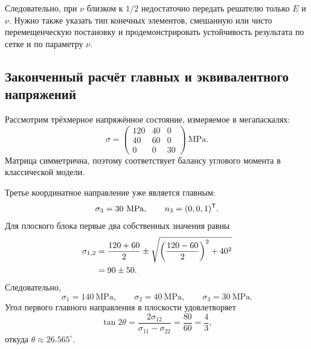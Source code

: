 Следовательно, при $\nu$ близком к $1/2$ недостаточно передать решателю только $E$ и $\nu$. Нужно также указать тип конечных элементов, смешанную или чисто перемещенческую постановку и продемонстрировать устойчивость результата по сетке и по параметру $\nu$.

\subsection{Законченный расчёт главных и эквивалентного напряжений}
\label{subsec:worked-von-mises-v05}

Рассмотрим трёхмерное напряжённое состояние, измеряемое в мегапаскалях:
\begin{equation}
\label{eq:worked-stress-tensor-v05}
 \sigma
 =
 \begin{pmatrix}
 120&40&0\\
 40&60&0\\
 0&0&30
 \end{pmatrix}
 \ \mathrm{MPa}.
\end{equation}
Матрица симметрична, поэтому соответствует балансу углового момента в классической модели.

Третье координатное направление уже является главным:
\[
 \sigma_3=30\ \mathrm{MPa},
 \qquad
 n_3=(0,0,1)^{\mathsf{T}}.
\]
Для плоского блока первые два собственных значения равны
\begin{align}
 \sigma_{1,2}
 &=\frac{120+60}{2}
 \pm
 \sqrt{
 \left(\frac{120-60}{2}\right)^2+40^2
 }
 \notag\\
 &=90\pm 50.
 \label{eq:worked-principal-stresses-v05}
\end{align}
Следовательно,
\begin{equation}
\label{eq:worked-principal-values-v05}
 \sigma_1=140\ \mathrm{MPa},
 \qquad
 \sigma_2=40\ \mathrm{MPa},
 \qquad
 \sigma_3=30\ \mathrm{MPa}.
\end{equation}
Угол первого главного направления в плоскости удовлетворяет
\begin{equation}
\label{eq:worked-principal-angle-v05}
 \tan 2\theta
 =\frac{2\sigma_{12}}{\sigma_{11}-\sigma_{22}}
 =\frac{80}{60}
 =\frac43,
\end{equation}
откуда $\theta\approx26.565^\circ$.

